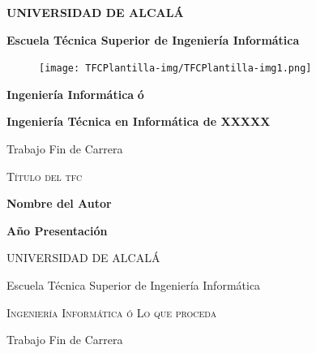 \documentclass[a4paper]{article}
\title{}
\author{Subdirector}
\date{2008-05-06}
\begin{document}
\clearpage\setcounter{page}{1}\pagestyle{Standard}

\bigskip

{\centering\bfseries
UNIVERSIDAD DE ALCALÁ
\par}


\bigskip

{\centering
{\textbf{E}}{\textbf{scuela Técnica Superior de Ingeniería Informática}}
\par}

\begin{figure}
\centering
\texttt{[image: TFCPlantilla-img/TFCPlantilla-img1.png]}
\end{figure}
{\centering
{\textbf{Ingeniería Informática}}{\textbf{ ó }}
\par}

{\centering\bfseries
Ingeniería Técnica en Informática de XXXXX
\par}


\bigskip

{\centering
Trabajo Fin de Carrera
\par}


\bigskip


\bigskip

{\centering\scshape
Título del tfc
\par}


\bigskip


\bigskip


\bigskip


\bigskip


\bigskip

{\centering\bfseries
Nombre del Autor
\par}

{\centering\bfseries
Año Presentación
\par}

\clearpage
\bigskip

\clearpage
\bigskip

{\centering
UNIVERSIDAD DE ALCALÁ
\par}

{\centering
Escuela Técnica Superior de Ingeniería Informática
\par}

{\centering
{\textsc{Ingeniería Informática}}{\textsc{ ó Lo que proceda}}
\par}


\bigskip

{\centering
Trabajo Fin de Carrera
\par}


\bigskip
\end{document}

